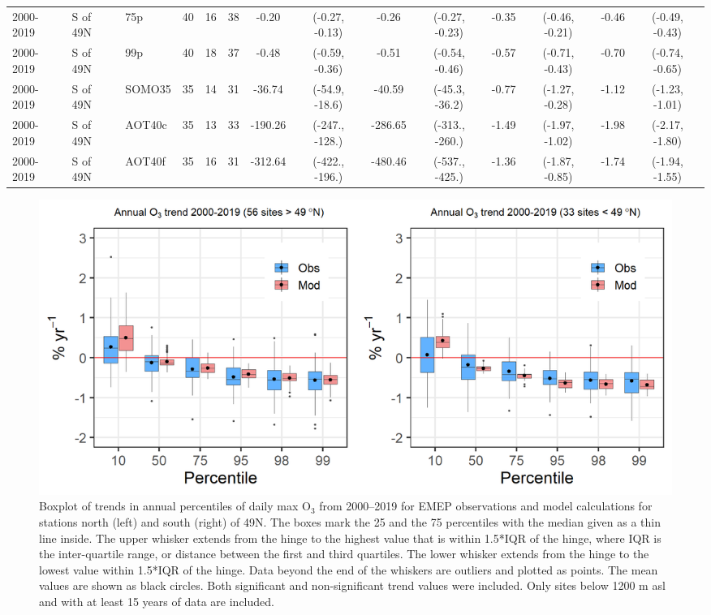 \begin{table}
\begin{center}
{\begin{tabular}{Hll|ccc|cccc|cccc}
\\
2000-2019 & S of 49N & 75p &  40 &  16 &  38 & -0.20 & (-0.27, -0.13) & -0.26 & (-0.27, -0.23) & -0.35 & (-0.46, -0.21) & -0.46 & (-0.49, -0.43) \\
2000-2019 & S of 49N & 99p &  40 &  18 &  37 & -0.48 & (-0.59, -0.36) & -0.51 & (-0.54, -0.46) & -0.57 & (-0.71, -0.43) & -0.70 & (-0.74, -0.65) \\
2000-2019 & S of 49N & SOMO35 &  35 &  14 &  31 & -36.74 & (-54.9, -18.6) & -40.59 & (-45.3, -36.2) & -0.77 & (-1.27, -0.28) & -1.12 & (-1.23, -1.01) \\
2000-2019 & S of 49N & AOT40c &  35 &  13 &  33 & -190.26 & (-247., -128.) & -286.65 & (-313., -260.) & -1.49 & (-1.97, -1.02) & -1.98 & (-2.17, -1.80) \\
2000-2019 & S of 49N & AOT40f &  35 &  16 &  31 & -312.64 & (-422., -196.) & -480.46 & (-537., -425.) & -1.36 & (-1.87, -0.85) & -1.74 & (-1.94, -1.55) \\
\bottomrule
\end{tabular}
} %
\end{center}
\end{table}




\begin{figure}[h]
	\centering
	\includegraphics[width=0.74\paperwidth]{FIGS_TRENDS/O3_boxpl.png}
	\caption{\label{fig:O3_boxplot}Boxplot of trends in annual percentiles of daily max O$_3$ from 2000--2019 for EMEP observations and model calculations for stations north (left) and south (right) of 49\degrees N. The boxes mark the 25 and the 75 percentiles with the median given as a thin line inside. The upper whisker extends from the hinge to the highest value that is within 1.5*IQR of the hinge, where IQR is the inter-quartile range, or distance between the first and third quartiles. The lower whisker extends from the hinge to the lowest value within 1.5*IQR of the hinge. Data beyond the end of the whiskers are outliers and plotted as points. The mean values are shown as black circles. Both significant and non-significant trend values were included. Only sites below 1200 m asl and with at least 15 years of data are included.}
\end{figure}

